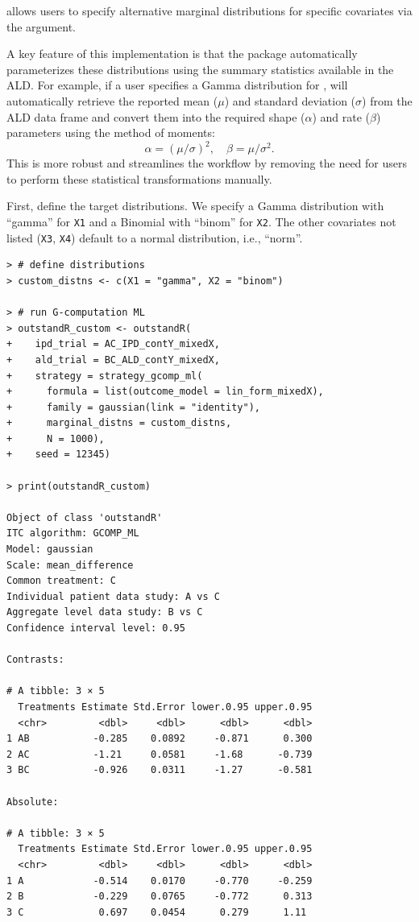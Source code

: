 \documentclass[article]{jss}
\begin{document}
 allows users to specify alternative marginal distributions for specific covariates via the  argument.

A key feature of this implementation is that the package automatically parameterizes these distributions using the summary statistics available in the ALD. For example, if a user specifies a Gamma distribution for ,  will automatically retrieve the reported mean ($\mu$) and standard deviation ($\sigma$) from the ALD data frame and convert them into the required shape ($\alpha$) and rate ($\beta$) parameters using the method of moments:
\begin{equation*}
\alpha = (\mu / \sigma)^2, \quad \beta = \mu / \sigma^2.
\end{equation*}
This is more robust and streamlines the workflow by removing the need for users to perform these statistical transformations manually.

First, define the target distributions. We specify a Gamma distribution with “gamma” for \texttt{X1} and a Binomial with “binom” for \texttt{X2}. The other covariates not listed (\texttt{X3}, \texttt{X4}) default to a normal distribution, i.e., “norm”.

\begin{verbatim}
> # define distributions
> custom_distns <- c(X1 = "gamma", X2 = "binom")

> # run G-computation ML
> outstandR_custom <- outstandR(
+    ipd_trial = AC_IPD_contY_mixedX,
+    ald_trial = BC_ALD_contY_mixedX,
+    strategy = strategy_gcomp_ml(
+      formula = list(outcome_model = lin_form_mixedX),
+      family = gaussian(link = "identity"),
+      marginal_distns = custom_distns,
+      N = 1000),
+    seed = 12345)

> print(outstandR_custom)

Object of class 'outstandR' 
ITC algorithm: GCOMP_ML 
Model: gaussian 
Scale: mean_difference 
Common treatment: C 
Individual patient data study: A vs C 
Aggregate level data study: B vs C 
Confidence interval level: 0.95 

Contrasts:

# A tibble: 3 × 5
  Treatments Estimate Std.Error lower.0.95 upper.0.95
  <chr>         <dbl>     <dbl>      <dbl>      <dbl>
1 AB           -0.285    0.0892     -0.871      0.300
2 AC           -1.21     0.0581     -1.68      -0.739
3 BC           -0.926    0.0311     -1.27      -0.581

Absolute:

# A tibble: 3 × 5
  Treatments Estimate Std.Error lower.0.95 upper.0.95
  <chr>         <dbl>     <dbl>      <dbl>      <dbl>
1 A            -0.514    0.0170     -0.770     -0.259
2 B            -0.229    0.0765     -0.772      0.313
3 C             0.697    0.0454      0.279      1.11 
\end{verbatim}
\end{document}
